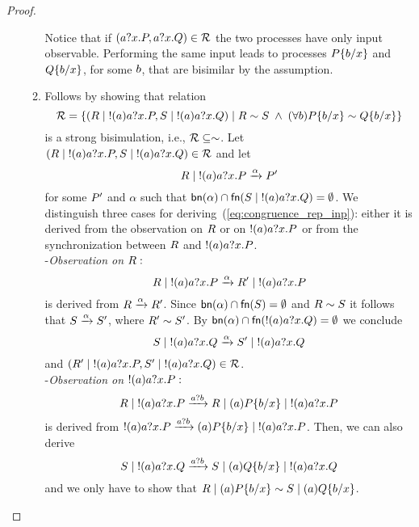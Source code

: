 \begin{proof}
\begin{itemize}
\begin{enumerate}
\[\]
Notice that if $(a?x.P , a?x.Q)\in{\cal R}$ the two processes have only input observable. Performing the same input leads to processes $P\{b/x\}$ and $ Q\{b/x\}$, for some $b$, that are bisimilar by the assumption.
\item Follows by showing that relation  
\[
{\cal R}=\{(R \;|\; !(a)a?x.P, S \;|\; !(a)a?x.Q) \;|\; R\sim S \;\wedge\; (\forall b) P\{b/x\} \sim Q\{b/x\}\}
\]
is a strong bisimulation, i.e., ${\cal R}\subseteq \sim$. Let $(R \;|\; !(a)a?x.P, S \;|\; !(a)a?x.Q)\in {\cal R}$ and let 
\begin{equation}\label{eq:congruence_rep_inp}
R \;|\; !(a)a?x.P\xrightarrow{\alpha}P'
\end{equation}
for some $P'$ and $\alpha$ such that $\mathsf{bn}(\alpha)\cap\mathsf{fn}(S \;|\; !(a)a?x.Q)=\emptyset$. We distinguish three cases for deriving~(\ref{eq:congruence_rep_inp}): either it is derived from the observation on $R$ or on $!(a)a?x.P$ or from the synchronization between $R$ and $!(a)a?x.P$.
\\
-\emph{Observation on} $R:$
\[
R \;|\; !(a)a?x.P\xrightarrow{\alpha}R' \;|\; !(a)a?x.P
\]
is derived from $R\xrightarrow{\alpha}R'$. Since $\mathsf{bn}(\alpha)\cap\mathsf{fn}(S)=\emptyset$ and $R\sim S$ it follows that $S\xrightarrow{\alpha}S'$, where $R'\sim S'$. By $\mathsf{bn}(\alpha)\cap\mathsf{fn}(!(a)a?x.Q)=\emptyset$ we conclude
\[
S \;|\; !(a)a?x.Q\xrightarrow{\alpha}S' \;|\; !(a)a?x.Q
\]
and $(R' \;|\; !(a)a?x.P,S' \;|\; !(a)a?x.Q)\in{\cal R}$.
\\
-\emph{Observation on} $!(a)a?x.P:$
\[
R \;|\; !(a)a?x.P\xrightarrow{a?b}R \;|\; (a)P\{b/x\} \;|\; !(a)a?x.P
\]
is derived from $!(a)a?x.P\xrightarrow{a?b} (a)P\{b/x\} \;|\; !(a)a?x.P$. Then, we can also derive 
\[
S \;|\; !(a)a?x.Q\xrightarrow{a?b}S \;|\; (a)Q\{b/x\} \;|\; !(a)a?x.Q
\]
and we only have to show that $R \;|\; (a)P\{b/x\}\sim S \;|\; (a)Q\{b/x\}$. 

\end{enumerate}
\end{itemize}
\end{proof}
